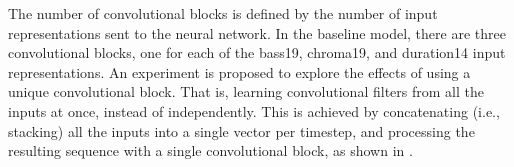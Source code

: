 
The number of convolutional blocks is defined by the number
of input representations sent to the neural network. In the
baseline model, there are three convolutional blocks, one
for each of the \gls{bass19}, \gls{chroma19}, and
\gls{duration14} input representations. An experiment is
proposed to explore the effects of using a unique
convolutional block. That is, learning convolutional filters
from all the inputs at once, instead of independently. This
is achieved by concatenating (i.e., stacking) all the inputs
into a single vector per timestep, and processing the
resulting sequence with a single convolutional block, as
shown in .

